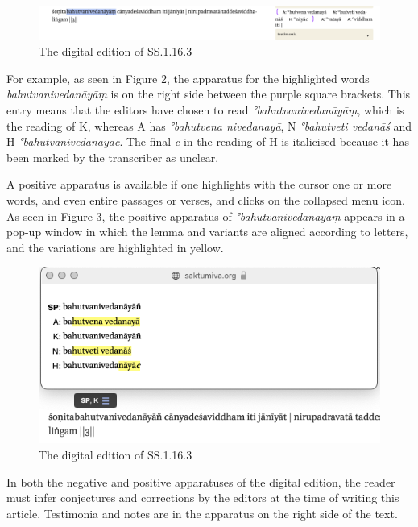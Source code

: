 \begin{figure}[h]
    \centering
    \includegraphics[draft=false,scale=.375]{media/SS.1.16}
    \caption{The digital edition of SS.1.16.3}
    \label{SS.1.16}
\end{figure}

For example, as seen in Figure 2, the apparatus for the highlighted words \emph{bahutvanivedanāyāṃ} is on the right side between the purple square brackets. This entry means that the editors have chosen to read \emph{°bahutvanivedanāyāṃ}, which is the reading of K, whereas A has \emph{°bahutvena nivedanayā}, N \emph{°bahutveti vedanāś} and H \emph{°bahutvanivedanāyāc}. The final \emph{c} in the reading of H is italicised because it has been marked by the transcriber as unclear.

A positive apparatus is available if one highlights with the cursor one or more words, and even entire passages or verses, and clicks on the collapsed menu icon. 
As seen in Figure 3, the positive apparatus of \emph{°bahutvanivedanāyāṃ} appears in a pop-up window in which the lemma and variants are aligned according to letters, and the variations are highlighted in yellow.

\begin{figure}[h]
    \centering
    \includegraphics[draft=false,scale=.5]{media/SS.1.16.positive}
    \caption{The digital edition of SS.1.16.3}
    \label{SS.1.16}
\end{figure}

In both the negative and positive apparatuses of the digital edition, the reader must infer conjectures and corrections by the editors at the time of writing this article. Testimonia and notes are in the apparatus on the right side of the text. 




